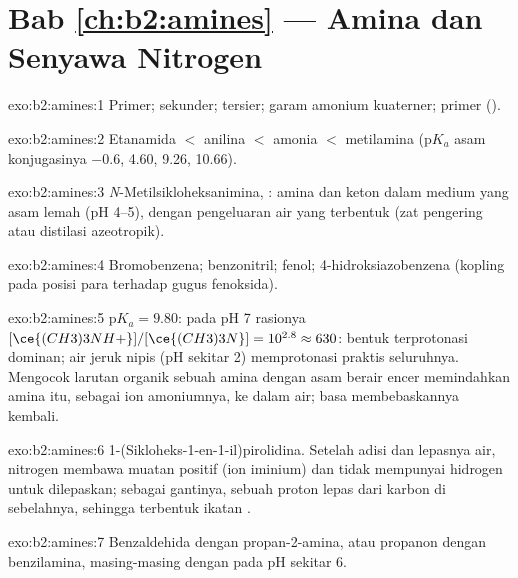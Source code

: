 \section*{Bab \ref{ch:b2:amines} --- Amina dan Senyawa Nitrogen}

\begin{solution}{exo:b2:amines:1}
Primer; sekunder; tersier; garam amonium kuaterner; primer ().
\end{solution}

\begin{solution}{exo:b2:amines:2}
Etanamida $<$ anilina $<$ amonia $<$ metilamina ($\mathrm pK_a$ asam konjugasinya
$-0.6$, 4.60, 9.26, 10.66).
\end{solution}

\begin{solution}{exo:b2:amines:3}
\textit{N}-Metilsikloheksanimina, : amina dan keton dalam
medium yang asam lemah (pH 4--5), dengan pengeluaran air yang terbentuk (zat
pengering atau distilasi azeotropik).
\end{solution}

\begin{solution}{exo:b2:amines:4}
Bromobenzena; benzonitril; fenol; 4-hidroksiazobenzena 
(kopling pada posisi para terhadap gugus  fenoksida).
\end{solution}

\begin{solution}{exo:b2:amines:5}
$\mathrm pK_a = 9.80$: pada pH 7 rasionya $[\ce{(CH3)3NH+}]/[\ce{(CH3)3N}] = 10^{2.8} \approx 630$:
bentuk terprotonasi dominan; air jeruk nipis (pH sekitar 2) memprotonasi
praktis seluruhnya. Mengocok larutan organik sebuah amina dengan asam berair
encer memindahkan amina itu, sebagai ion amoniumnya, ke dalam air; basa
membebaskannya kembali.
\end{solution}

\begin{solution}{exo:b2:amines:6}
1-(Sikloheks-1-en-1-il)pirolidina. Setelah adisi dan lepasnya air, nitrogen
membawa muatan positif (ion iminium) dan tidak mempunyai hidrogen untuk
dilepaskan; sebagai gantinya, sebuah proton lepas dari karbon di sebelahnya,
sehingga terbentuk ikatan .
\end{solution}

\begin{solution}{exo:b2:amines:7}
Benzaldehida dengan propan-2-amina, atau propanon dengan benzilamina,
masing-masing dengan  pada pH sekitar 6.
\end{solution}

